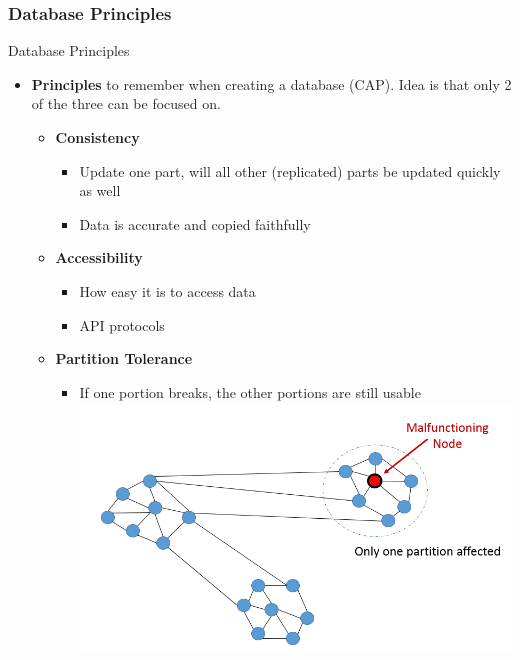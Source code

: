 \documentclass{beamer}
\begin{document}
    \subsubsection{Database Principles}
    \begin{frame}{Database Principles}
        \begin{itemize}
            \item \textbf{Principles} to remember when creating a database (CAP). Idea is that only 2 of the three can be focused on. \cite[Ch.~19]{Silberschatz2010}
            \begin{itemize}
                \item \textbf{Consistency}
                \begin{itemize}
                    \item Update one part, will all other (replicated) parts be updated quickly as well
                    \item Data is accurate and copied faithfully
                \end{itemize}
                \item \textbf{Accessibility}
                \begin{itemize}
                    \item How easy it is to access data
                    \item API protocols
                \end{itemize}
                \item  \textbf{Partition Tolerance}
                \begin{itemize}
                    \item If one portion breaks, the other portions are still usable
                    \centering 
                    \includegraphics[scale=0.2]{partition_tolerance.png}
                    \end{itemize} 
             \end{itemize}
        \end{itemize}
    \end{frame}
\end{document}
